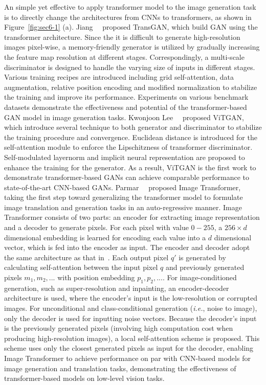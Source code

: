 An simple yet effective to apply transformer model to the image generation task is to directly change the architectures from CNNs to transformers, as shown in Figure~\ref{fig:sec6-1} (a). Jiang~\etal~ proposed TransGAN, which build GAN using the transformer architecture. Since the it is difficult to generate high-resolution images pixel-wise, a memory-friendly generator is utilized by gradually increasing the feature map resolution at different stages. Correspondingly, a multi-scale discriminator is designed to handle the varying size of inputs in different stages. Various training recipes are introduced including grid self-attention, data augmentation, relative position encoding and modified normalization to stabilize the training and improve its performance. Experiments on various benchmark datasets demonstrate the effectiveness and potential of the transformer-based GAN model in image generation tasks. Kwonjoon Lee~\etal~ proposed ViTGAN, which introduce several technique to both generator and discriminator to stabilize the training procedure and convergence. Euclidean distance is introduced for the self-attention module to enforce the Lipschitzness of transformer discriminator. Self-modulated layernorm and implicit neural representation are proposed to enhance the training for the generator. As a result, ViTGAN is the first work to demonstrate transformer-based GANs can achieve comparable performance to state-of-the-art CNN-based GANs.  
Parmar~\etal~ proposed Image Transformer, taking the first step toward generalizing the transformer model to formulate image translation and generation tasks in an auto-regressive manner. Image Transformer consists of two parts: an encoder for extracting image representation and a decoder to generate pixels. For each pixel with value $0-255$, a $256 \times d$ dimensional embedding is learned for encoding each value into a $d$ dimensional vector, which is fed into the encoder as input. The encoder and decoder adopt the same architecture as that in~. 
Each output pixel $q'$ is generated by calculating self-attention between the input pixel $q$ and previously generated pixels $m_1,m_2,...$ with position embedding $p_1,p_2,...$. For image-conditioned generation, such as super-resolution and inpainting, an encoder-decoder architecture is used, where the encoder's input is the low-resolution or corrupted images. For unconditional and class-conditional generation (\emph{i.e.}, noise to image), only the decoder is used for inputting noise vectors. Because the decoder's input is the previously generated pixels (involving high computation cost when producing high-resolution images), a local self-attention scheme is proposed. This scheme uses only the closest generated pixels as input for the decoder, enabling Image Transformer to achieve performance on par with CNN-based models for image generation and translation tasks, demonstrating the effectiveness of transformer-based models on low-level vision tasks.
